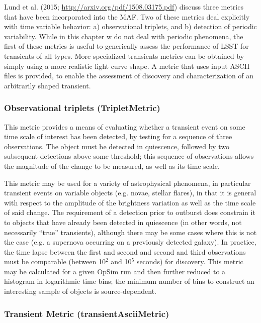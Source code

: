 Lund et al. (2015; \url{http://arxiv.org/pdf/1508.03175.pdf}) discuss
three metrics that have been incorporated into the MAF. Two of these
metrics deal explicitly with time variable behavior: a) observational
triplets, and b) detection of periodic variability. While in this
chapter w do not deal with periodic phenomena, the first of these
metrics is useful to generically assess the performance of LSST for
transients of all types. More specialized transients metrics can be
obtained by simply using a more realistic light curve shape. A metric
that uses input ASCII files is provided, to enable the assessment of
discovery and characterization of an arbitrarily shaped transient.

\subsubsection{Observational triplets (TripletMetric)}

This metric provides a means of evaluating whether a transient event
on some time scale of interest has been detected, by testing for a
sequence of three observations. The object must be detected in
quiescence, followed by two subsequent detections above some
threshold; this sequence of observations allows the magnitude of the
change to be measured, as well as its time scale.

This metric may be used for a variety of astrophysical phenomena, in
particular transient events on variable objects (e.g. novae, stellar
flares), in that it is general with respect to the amplitude of the
brightness variation as well as the time scale of said change. The
requirement of a detection prior to outburst does constrain it to
objects that have already been detected in quiescence (in other words,
not necessarily ``true'' transients), although there may be some cases
where this is not the case (e.g. a supernova occurring on a previously
detected galaxy). In practice, the time lapse between the first and
second and second and third observations must be comparable (between
10$^2$ and 10$^5$ seconds) for discovery. This metric may be
calculated for a given OpSim run and then further reduced to a
histogram in logarithmic time bins; the minimum number of bins to
construct an interesting sample of objects is source-dependent.

\subsubsection{Transient Metric (transientAsciiMetric)}

